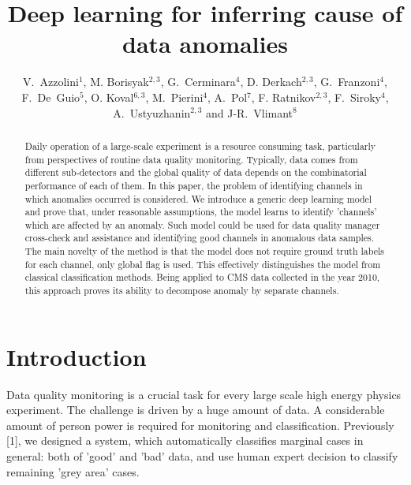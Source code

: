 \documentclass[a4paper]{jpconf}
\begin{document}
\title{Deep learning for inferring cause of data anomalies}

\author{V.~Azzolini$^1$, M. Borisyak$^{2,3}$, G.~Cerminara$^4$, D. Derkach$^{2,3}$, G.~Franzoni$^4$, F.~De~Guio$^5$, O. Koval$^{6,3}$, M.~Pierini$^4$, A.~Pol$^7$, F. Ratnikov$^{2,3}$, F.~Siroky$^4$, A.~Ustyuzhanin$^{2,3}$ and J-R.~Vlimant$^8$}

\address{$^1$ Massachusetts Institute of Technology, Cambridge, USA \\
$^2$ National Research University Higher School of Economics,  Moscow, Russia \\
$^3$ Yandex School of Data Analysis, Moscow, Russia \\
$^4$ CERN, European Organization for Nuclear Research, Geneva, Switzerland \\
$^5$ Texas Tech University, Lubbock, USA \\
$^6$ Skolkovo Institute of Science and Technology, Moscow, Russia \\
$^7$ University of Paris-Saclay, Paris, France \\
$^8$ California Institute of Technology, Pasadena, USA}



\begin{abstract} 
Daily operation of a large-scale experiment is a resource consuming task, particularly from perspectives of routine data quality monitoring. Typically, data comes from different sub-detectors and the global quality of data depends on the combinatorial performance of each of them. In this paper, the problem of identifying channels in which anomalies occurred is considered.
We introduce a generic deep learning model and prove that, under reasonable assumptions, the model learns to identify 'channels' which are affected by an anomaly. Such model could be used for data quality manager cross-check and assistance and identifying good channels in anomalous data samples.
The main novelty of the method is that the model does not require ground truth labels for each channel, only global flag is used. This effectively distinguishes the model from classical classification methods. Being applied to CMS data collected in the year 2010,  this approach proves its ability to decompose anomaly by separate channels. 
\end{abstract}




\section{Introduction}
Data quality monitoring is a crucial task for every large scale high energy physics experiment.
The challenge is driven by a huge amount of data. A considerable amount of person power is required for monitoring and classification. Previously [1], we designed a system, which automatically classifies marginal cases in general: both of 'good' and 'bad' data, and use human expert decision to classify remaining 'grey area' cases. 
\end{document}
